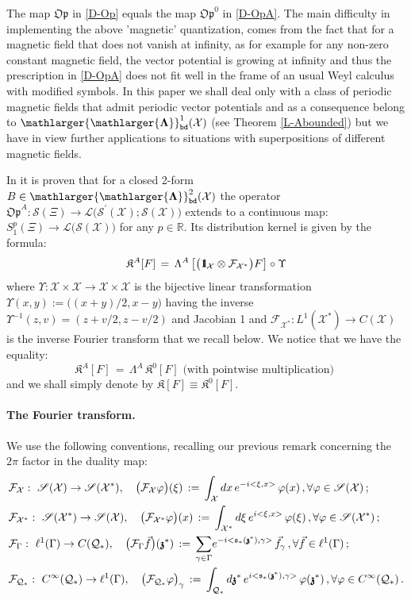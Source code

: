 \documentclass[12pt]{article}
\theoremstyle{definition}
\def\R{\mathbb{R}}
\def\Op{\mathfrak{Op}}
\def\X{\mathcal X}
\def\cL{\mathcal{L}}
\def\T{\mathcal{Q}}
\def\bb1{{\rm{1}\hspace{-3pt}\mathbf{l}}}
\def\s{\mathfrak{s}}
\def\bz{\mathfrak{z}\hspace*{-4pt}\mathfrak{z}}
\def\beq{\begin{equation}}
\def\eeq{\end{equation}}
\def\Fb{\mathlarger{\mathlarger{\mathbf{\Lambda}}}_{\text{\tt bd}}}
\numberwithin{equation}{section}
\begin{document}
The map $\Op$ in \eqref{D-Op} equals the map $\Op^0$ in \eqref{D-OpA}. The main difficulty in implementing the above 'magnetic' quantization, comes from the fact that for a magnetic field that does not vanish at infinity, as for example for any non-zero constant magnetic field, the vector potential is growing at infinity and thus the prescription in \eqref{D-OpA} does not fit well in the frame of an usual Weyl calculus with modified symbols. In this paper we shall deal only with a class of periodic magnetic fields that admit periodic vector potentials and as a consequence belong to $\Fb^1(\X)$ (see Theorem \ref{L-Abounded}) but we have in view further applications to situations with superpositions of different magnetic fields.


	In \cite{IMP-1} it is proven that for a closed 2-form $B\in\Fb^2(\X)$ the operator $\Op^A:\mathscr{S}(\Xi)\rightarrow\cL \big(\mathscr{S}^\prime(\X);\mathscr{S}(\X)\big)$ extends to a continuous map: $S^p_1(\Xi)\rightarrow\cL \big(\mathscr{S}(\X)\big)$ for any $p\in\R$. Its distribution kernel is given by the formula:
	\beq\label{DF-DistrKer}
	\mathfrak{K}^A[F]\,=\,\Lambda^A\,\big[\big(\bb1_{\X}\otimes\mathcal{F}_{\X^*}\big)F\big]\circ\Upsilon
	\eeq
	where $\Upsilon:\X\times\X\rightarrow\X\times\X$ is the bijective linear transformation $\Upsilon(x,y):=\big((x+y)/2,x-y\big)$ having the inverse $\Upsilon^{-1}(z,v)=(z+v/2,z-v/2)$ and Jacobian 1 and $\mathcal{F}_{\X^*}:L^1(\X^*)\rightarrow{C}(\X)$ is the inverse Fourier transform that we recall below. We notice  that we have the equality: $$\mathfrak{K}^A[F]\,=\,\Lambda^A\,\mathfrak{K}^0[F] \mbox{ (with pointwise multiplication) } $$ and we shall simply denote by $\mathfrak{K}[F]\equiv\mathfrak{K}^0[F]$.

\paragraph{The Fourier transform.}  We use the following conventions, recalling our previous remark concerning the $2\pi$ factor in the duality map:
\begin{align}
&\mathcal{F}_{\X}:\ \mathscr{S}(\X)\rightarrow\mathscr{S}(\X^*),\quad\big(\mathcal{F}_{\X}\varphi\big)(\xi)\,:=\,\int_{\X}dx\,e^{-i<\xi,x>}\,\varphi(x)\,,\forall\varphi\in\mathscr{S}(\X)\,;\\
&\mathcal{F}_{\X^*}:\ \mathscr{S}(\X^*)\rightarrow\mathscr{S}(\X),\quad\big(\mathcal{F}_{\X^*}\varphi\big)(x)\,:=\,\int_{\X^*}d\xi\,e^{i<\xi,x>}\,\varphi(\xi)\,,\forall\varphi\in\mathscr{S}(\X^*)\,;\\ \label{DF-Ftr-Gamma}
&\mathcal{F}_{\Gamma}:\ \ell^1(\Gamma)\rightarrow{C}(\T_*),\quad\big(\mathcal{F}_{\Gamma}\vec{f}\big)(\bz^*)\,:=\,\underset{\gamma\in\Gamma}{\sum}e^{-i<\s_*(\bz^*),\gamma>}\,\vec{f}_{\gamma}\,, \forall\vec{f}\in\ell^1(\Gamma)\,;\\ \label{DF-Ftr-Tstar}
&\mathcal{F}_{\T_*}:\ C^\infty(\T_*)\rightarrow\ell^1(\Gamma),\quad\big(\mathcal{F}_{\T_*}\varphi\big)_{\gamma}\,:=\,\int_{\T_*}d\bz^*\,e^{i<\s_*(\bz^*),\gamma>}\,\varphi(\bz^*)\,, \forall\varphi\in{C}^\infty(\T_*)\,.
\end{align}
\end{document}
